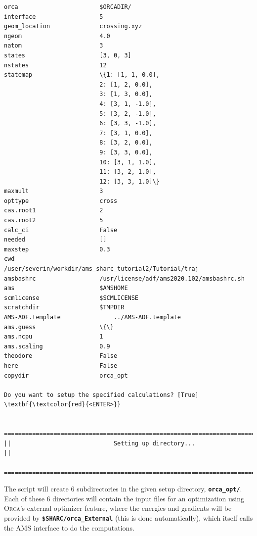 \documentclass[a4paper,11pt,DIV=15,openany]{scrbook}
\newcommand{\ttt}[1]{\textbf{\texttt{#1}}}
\begin{document}
\begin{oframed}
\begin{Verbatim}[commandchars=\\\{\}]
orca                       $ORCADIR/
interface                  5
geom_location              crossing.xyz
ngeom                      4.0
natom                      3
states                     [3, 0, 3]
nstates                    12
statemap                   \{1: [1, 1, 0.0], 
                           2: [1, 2, 0.0], 
                           3: [1, 3, 0.0], 
                           4: [3, 1, -1.0], 
                           5: [3, 2, -1.0], 
                           6: [3, 3, -1.0], 
                           7: [3, 1, 0.0], 
                           8: [3, 2, 0.0], 
                           9: [3, 3, 0.0], 
                           10: [3, 1, 1.0], 
                           11: [3, 2, 1.0], 
                           12: [3, 3, 1.0]\}
maxmult                    3
opttype                    cross
cas.root1                  2
cas.root2                  5
calc_ci                    False
needed                     []
maxstep                    0.3
cwd                        /user/severin/workdir/ams_sharc_tutorial2/Tutorial/traj
amsbashrc                  /usr/license/adf/ams2020.102/amsbashrc.sh
ams                        $AMSHOME
scmlicense                 $SCMLICENSE
scratchdir                 $TMPDIR
AMS-ADF.template               ../AMS-ADF.template
ams.guess                  \{\}
ams.ncpu                   1
ams.scaling                0.9
theodore                   False
here                       False
copydir                    orca_opt

Do you want to setup the specified calculations? [True] \textbf{\textcolor{red}{<ENTER>}}

  ================================================================================
||                             Setting up directory...                            ||
  ================================================================================
\end{Verbatim}
\end{oframed}

\normalsize
The script will create 6 subdirectories in the given setup directory, \ttt{orca\_opt/}.
Each of these 6 directories will contain the input files for an optimization using \textsc{Orca}'s external optimizer feature, where the energies and gradients will be provided by \ttt{\$SHARC/orca\_External} (this is done automatically), which itself calls the \textsc{AMS} interface to do the computations.
\end{document}
